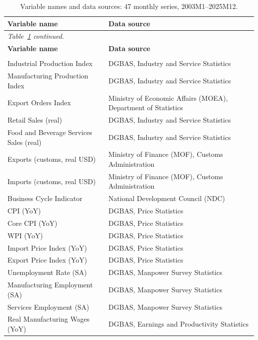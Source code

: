 \begin{center}
\small
\setlength{\tabcolsep}{5pt}
\renewcommand{\arraystretch}{1.06}
\begin{longtable}{p{7.1cm} p{7.1cm}}
\caption{Variable names and data sources: 47 monthly series, 2003M1--2025M12.}
\label{tab:variables}\\
\hline
\textbf{Variable name} & \textbf{Data source} \\
\hline
\endfirsthead
\multicolumn{2}{l}{\textit{Table~\ref{tab:variables} continued.}}\\
\hline
\textbf{Variable name} & \textbf{Data source} \\
\hline
\endhead
\hline
\endfoot
\multicolumn{2}{l}{\textbf{Panel A. Macroeconomic variables (17)}}\\
Industrial Production Index & DGBAS, Industry and Service Statistics \\
Manufacturing Production Index & DGBAS, Industry and Service Statistics \\
Export Orders Index & Ministry of Economic Affairs (MOEA), Department of Statistics \\
Retail Sales (real) & DGBAS, Industry and Service Statistics \\
Food and Beverage Services Sales (real) & DGBAS, Industry and Service Statistics \\
Exports (customs, real USD) & Ministry of Finance (MOF), Customs Administration \\
Imports (customs, real USD) & Ministry of Finance (MOF), Customs Administration \\
Business Cycle Indicator & National Development Council (NDC) \\
CPI (YoY) & DGBAS, Price Statistics \\
Core CPI (YoY) & DGBAS, Price Statistics \\
WPI (YoY) & DGBAS, Price Statistics \\
Import Price Index (YoY) & DGBAS, Price Statistics \\
Export Price Index (YoY) & DGBAS, Price Statistics \\
Unemployment Rate (SA) & DGBAS, Manpower Survey Statistics \\
Manufacturing Employment (SA) & DGBAS, Manpower Survey Statistics \\
Services Employment (SA) & DGBAS, Manpower Survey Statistics \\
Real Manufacturing Wages (YoY) & DGBAS, Earnings and Productivity Statistics \\

\end{longtable}
\end{center}
